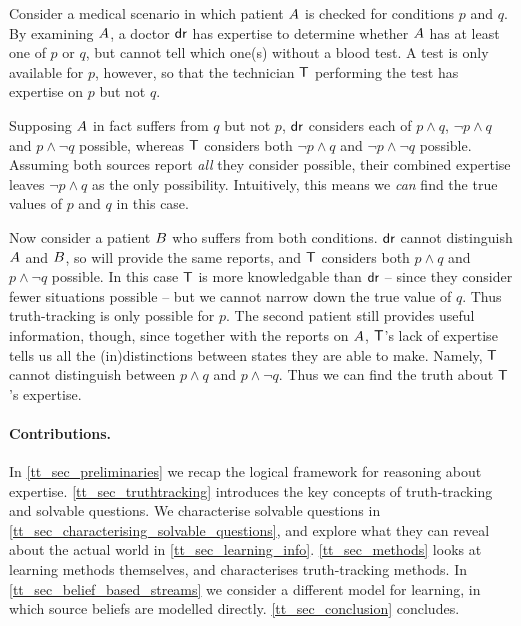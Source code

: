 \begin{example}
    \label{tt_ex_informal_example}

    Consider a medical scenario in which patient $A{}$ is checked for
    conditions $p$ and $q$. By examining $A{}$, a doctor
    $\mathsf{dr}{}$ has expertise to determine whether $A{}$ has at least one
    of $p$ or $q$, but cannot tell which one(s) without a blood test. A test is
    only available for $p$, however, so that the technician $\mathsf{T}{}$
    performing the test has expertise on $p$ but not $q$.

    Supposing $A{}$ in fact suffers from $q$ but not $p$, $\mathsf{dr}{}$
    considers each of $p \land q$, $\neg p \land q$ and $p \land \neg q$
    possible, whereas $\mathsf{T}{}$ considers both $\neg p \land q$ and $\neg p
    \land \neg q$ possible.
    Assuming both sources report \emph{all} they consider possible, their
    combined expertise leaves $\neg p \land q$ as the only
    possibility. Intuitively, this means we \emph{can} find the true values of
    $p$ and $q$ in this case.

    Now consider a patient $B{}$ who suffers from both conditions.
    $\mathsf{dr}{}$ cannot distinguish $A{}$ and $B{}$, so will provide
    the same reports, and $\mathsf{T}{}$ considers both $p \land q$ and $p \land
    \neg q$ possible. In this case $\mathsf{T}{}$ is more knowledgable than $\mathsf{dr}{}$
    -- since they consider fewer situations possible -- but we cannot narrow
    down the true value of $q$. Thus truth-tracking is only possible for $p$.
    The second patient still provides useful information, though, since
    together with the reports on $A{}$,
    $\mathsf{T}{}$'s lack of expertise tells us all the (in)distinctions between
    states they are able to make. Namely, $\mathsf{T}{}$ cannot distinguish between
    $p \land q$ and $p \land \neg q$. Thus we can find the truth about
    $\mathsf{T}{}$'s expertise.

\end{example}

\paragraph{Contributions.} 

\begin{chapteroutline}
    In \cref{tt_sec_preliminaries} we recap the logical framework for reasoning
    about expertise. \cref{tt_sec_truthtracking} introduces the key concepts of
    truth-tracking and solvable questions. We characterise solvable questions in
    \cref{tt_sec_characterising_solvable_questions}, and explore what they can reveal
    about the actual world in \cref{tt_sec_learning_info}. \cref{tt_sec_methods} looks at
    learning methods themselves, and characterises truth-tracking methods. In
    \cref{tt_sec_belief_based_streams} we consider a different model for
    learning, in which source beliefs are modelled directly.
    \cref{tt_sec_conclusion} concludes.
\end{chapteroutline}

